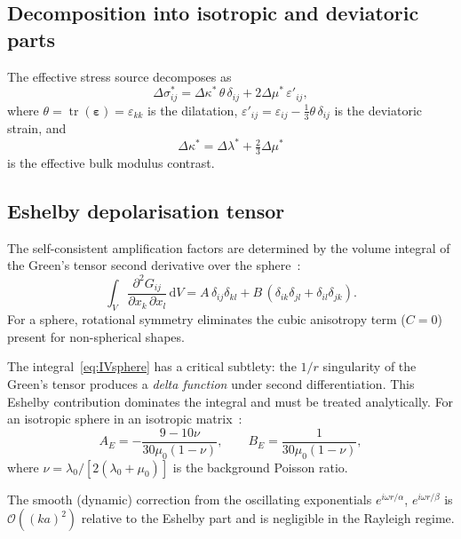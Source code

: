 \documentclass[11pt,a4paper]{article}
\newcommand{\dd}{\mathrm{d}}
\newcommand{\order}[1]{\mathcal{O}\!\left(#1\right)}
\newcommand{\Dlam}{\Delta\lambda}
\newcommand{\Dmu}{\Delta\mu}
\newcommand{\Dkappa}{\Delta\kappa}
\newcommand{\tr}{\operatorname{tr}}
\newcommand{\beps}{\boldsymbol{\varepsilon}}
\begin{document}
\subsection{Decomposition into isotropic and deviatoric parts}

The effective stress source decomposes as
\begin{equation}
  \Delta\sigma^*_{ij}
  = \Dkappa^*\,\theta\,\delta_{ij}
  + 2\Dmu^*\,\varepsilon'_{ij},
  \label{eq:stress_decomp}
\end{equation}
where $\theta = \tr(\beps) = \varepsilon_{kk}$ is the dilatation,
$\varepsilon'_{ij} = \varepsilon_{ij} - \tfrac{1}{3}\theta\,\delta_{ij}$
is the deviatoric strain, and
\begin{equation}
  \Dkappa^* = \Dlam^* + \tfrac{2}{3}\Dmu^*
  \label{eq:Dkappa_def}
\end{equation}
is the effective bulk modulus contrast.

\subsection{Eshelby depolarisation tensor}

The self-consistent amplification factors are determined by the
volume integral of the Green's tensor second derivative over the
sphere~\cite{Eshelby1957,Mura1987}:
\begin{equation}
  \int_V \frac{\partial^2 G_{ij}}{\partial x_k\,\partial x_l}\,\dd V
  = A\,\delta_{ij}\delta_{kl}
  + B\,(\delta_{ik}\delta_{jl} + \delta_{il}\delta_{jk}).
  \label{eq:IVsphere}
\end{equation}
For a sphere, rotational symmetry eliminates the cubic anisotropy
term ($C = 0$) present for non-spherical shapes.

The integral~\eqref{eq:IVsphere} has a critical subtlety: the
$1/r$ singularity of the Green's tensor produces a
\emph{delta function} under second differentiation.  This Eshelby
contribution dominates the integral and must be treated analytically.
For an isotropic sphere in an isotropic
matrix~\cite{Eshelby1957,Mura1987}:
\begin{equation}
  \boxed{
  A_E = -\frac{9 - 10\nu}{30\mu_0(1 - \nu)},
  \qquad
  B_E = \frac{1}{30\mu_0(1 - \nu)},
  }
  \label{eq:eshelby_AB}
\end{equation}
where $\nu = \lambda_0 / [2(\lambda_0 + \mu_0)]$ is the background
Poisson ratio.

The smooth (dynamic) correction from the oscillating exponentials
$e^{i\omega r/\alpha}$, $e^{i\omega r/\beta}$ is
$\order{(ka)^2}$ relative to the Eshelby part and is negligible
in the Rayleigh regime.
\end{document}
